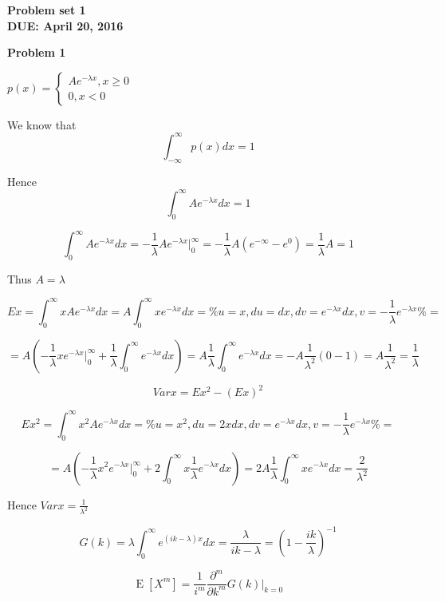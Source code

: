 \documentclass[12pt]{article}
\begin{document}
	\begin{center}
		\textbf{Problem set 1 \\
			DUE: April 20, 2016 \\}
	\end{center}
		
	\bigskip
	
	\textbf{Problem 1}		
	
	\bigskip
		
	$	p(x) = \begin{cases}
		A e^{-\lambda x}, x \geq 0\\
		0, x < 0
	\end{cases}
	$ 
	
	We know that $$ \int_{-\infty}^{\infty} p(x) dx = 1 $$
	
	Hence $$ \int_{0}^{\infty} A e^{-\lambda x} dx = 1 $$
	
	$$ \int_{0}^{\infty} A e^{-\lambda x} dx = -\frac{1}{\lambda} A e^{-\lambda x} |_{0}^{\infty} = -\frac{1}{\lambda} A (e^{-\infty} - e^0) = \frac{1}{\lambda} A = 1 $$
	
	Thus $A = \lambda$ 
	
	$$ Ex = \int_{0}^{\infty} x A e^{-\lambda x} dx = A \int_{0}^{\infty} x e^{-\lambda x} dx = \% u = x, du = dx, dv = e^{-\lambda x}dx, v = -\frac{1}{\lambda} e^{-\lambda x} \% = $$
	
	$$ = A \left( -\frac{1}{\lambda} xe^{-\lambda x} |_{0}^{\infty} + \frac{1}{\lambda} \int_{0}^{\infty} e^{-\lambda x} dx \right) = A \frac{1}{\lambda} \int_{0}^{\infty} e^{-\lambda x} dx = - A \frac{1}{\lambda^2}(0 - 1) = A \frac{1}{\lambda^2} = \frac{1}{\lambda} $$
	
	$$ Var x = Ex^2 - (Ex)^2 $$
	
	$$ Ex^2 = \int_{0}^{\infty} x^2 A e^{-\lambda x} dx = \% u = x^2, du = 2xdx, dv = e^{-\lambda x}dx, v = -\frac{1}{\lambda} e^{-\lambda x} \% = $$
	
	$$ = A \left( - \frac{1}{\lambda} x^2 e^{-\lambda x} |_{0}^{\infty} + 2 \int_{0}^{\infty} x \frac{1}{\lambda} e^{-\lambda x} dx \right) = 2A\frac{1}{\lambda} \int_{0}^{\infty} x e^{-\lambda x} dx = \frac{2}{\lambda^2} $$
	
	Hence $Varx = \frac{1}{\lambda^2}$
	
	$$ G(k) = \lambda \int_{0}^{\infty} e^{(ik - \lambda) x} dx = \frac{\lambda}{ik - \lambda} = \left(1 - \frac{ik}{\lambda} \right)^{-1} $$
	
	$$ \operatorname{E}[X^m] = \frac{1}{i^m} \frac{\partial ^m}{\partial k^m} G(k) |_{k = 0} $$
	
\end{document}
